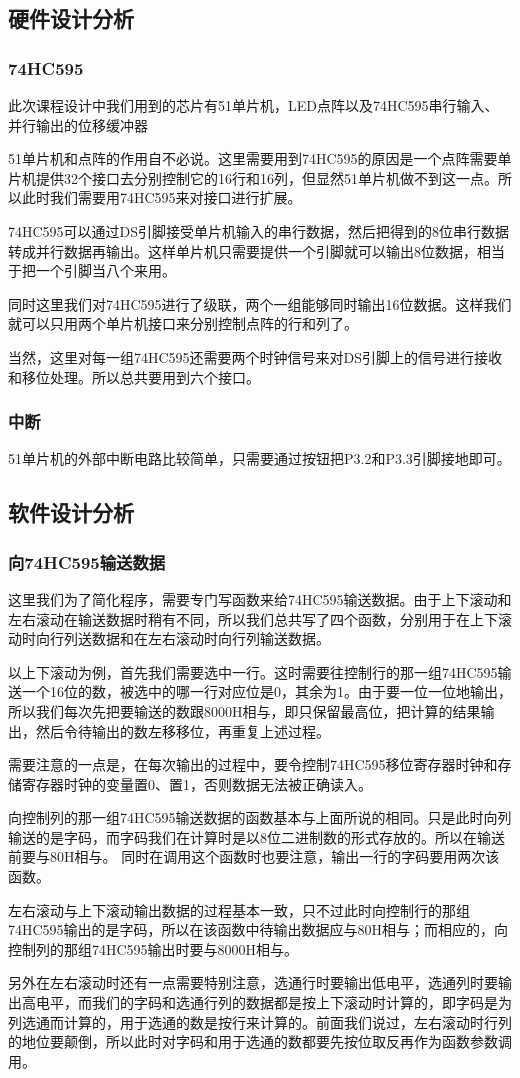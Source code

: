 \documentclass[UTF8]{ctexart}
\begin{document}
\subsection{硬件设计分析}
\subsubsection{74HC595}
此次课程设计中我们用到的芯片有51单片机，LED点阵以及74HC595串行输入、并行输出的位移缓冲器\par
51单片机和点阵的作用自不必说。这里需要用到74HC595的原因是一个点阵需要单片机提供32个接口去分别控制它的16行和16列，但显然51单片机做不到这一点。所以此时我们需要用74HC595来对接口进行扩展。\par
74HC595可以通过DS引脚接受单片机输入的串行数据，然后把得到的8位串行数据转成并行数据再输出。这样单片机只需要提供一个引脚就可以输出8位数据，相当于把一个引脚当八个来用。\par
同时这里我们对74HC595进行了级联，两个一组能够同时输出16位数据。这样我们就可以只用两个单片机接口来分别控制点阵的行和列了。\par
当然，这里对每一组74HC595还需要两个时钟信号来对DS引脚上的信号进行接收和移位处理。所以总共要用到六个接口。
\subsubsection{中断}
 51单片机的外部中断电路比较简单，只需要通过按钮把P3.2和P3.3引脚接地即可。
\subsection{软件设计分析}
\subsubsection{向74HC595输送数据}
这里我们为了简化程序，需要专门写函数来给74HC595输送数据。由于上下滚动和左右滚动在输送数据时稍有不同，所以我们总共写了四个函数，分别用于在上下滚动时向行列送数据和在左右滚动时向行列输送数据。\par
以上下滚动为例，首先我们需要选中一行。这时需要往控制行的那一组74HC595输送一个16位的数，被选中的哪一行对应位是0，其余为1。由于要一位一位地输出，所以我们每次先把要输送的数跟8000H相与，即只保留最高位，把计算的结果输出，然后令待输出的数左移移位，再重复上述过程。\par
需要注意的一点是，在每次输出的过程中，要令控制74HC595移位寄存器时钟和存储寄存器时钟的变量置0、置1，否则数据无法被正确读入。\par
向控制列的那一组74HC595输送数据的函数基本与上面所说的相同。只是此时向列输送的是字码，而字码我们在计算时是以8位二进制数的形式存放的。所以在输送前要与80H相与。
同时在调用这个函数时也要注意，输出一行的字码要用两次该函数。\par
左右滚动与上下滚动输出数据的过程基本一致，只不过此时向控制行的那组74HC595输出的是字码，所以在该函数中待输出数据应与80H相与；而相应的，向控制列的那组74HC595输出时要与8000H相与。\par
另外在左右滚动时还有一点需要特别注意，选通行时要输出低电平，选通列时要输出高电平，而我们的字码和选通行列的数据都是按上下滚动时计算的，即字码是为列选通而计算的，用于选通的数是按行来计算的。前面我们说过，左右滚动时行列的地位要颠倒，所以此时对字码和用于选通的数都要先按位取反再作为函数参数调用。\par
\end{document}
